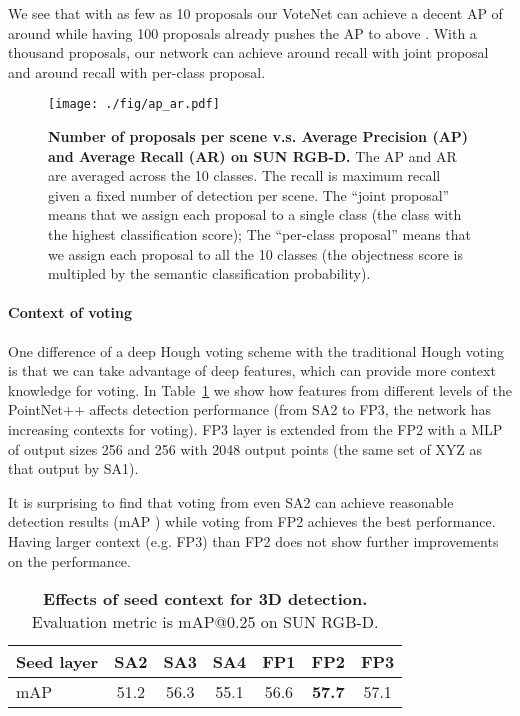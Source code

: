 \documentclass[10pt,twocolumn,letterpaper]{article}
\newcommand\votenet{VoteNet}
\begin{document}
We see that with as few as 10 proposals our \votenet{} can achieve a decent AP of around  while having 100 proposals already pushes the AP to above . With a thousand proposals, our network can achieve around  recall with joint proposal and around  recall with per-class proposal.

\begin{figure}
    \centering
    \texttt{[image: ./fig/ap\_ar.pdf]}
    \caption{\textbf{Number of proposals per scene v.s. Average Precision (AP) and Average Recall (AR) on SUN RGB-D.} The AP and AR are averaged across the 10 classes. The recall is maximum recall given a fixed number of detection per scene. The ``joint proposal'' means that we assign each proposal to a single class (the class with the highest classification score); The ``per-class proposal'' means that we assign each proposal to all the 10 classes (the objectness score is multipled by the semantic classification probability).}
    \label{fig:ap_ar}
\end{figure}

\paragraph{Context of voting}
One difference of a deep Hough voting scheme with the traditional Hough voting is that we can take advantage of deep features, which can provide more context knowledge for voting. In Table~\ref{tab:vote_context} we show how features from different levels of the PointNet++ affects detection performance (from SA2 to FP3, the network has increasing contexts for voting). FP3 layer is extended from the FP2 with a MLP of output sizes 256 and 256 with 2048 output points (the same set of XYZ as that output by SA1).

It is surprising to find that voting from even SA2 can achieve reasonable detection results (mAP ) while voting from FP2 achieves the best performance. Having larger context (e.g. FP3) than FP2 does not show further improvements on the performance.

\begin{table}[h]
    \begin{center}
    \begin{tabular}{l|cccccc}
    \toprule
         Seed layer & SA2 & SA3 & SA4 & FP1 & FP2 & FP3 \\ \midrule
         mAP & 51.2 & 56.3 & 55.1 & 56.6 & \textbf{57.7} & 57.1 \\ \bottomrule
    \end{tabular}
    \end{center}
    \caption{\textbf{Effects of seed context for 3D detection.} Evaluation metric is mAP@0.25 on SUN RGB-D.}
    \label{tab:vote_context}
\end{table}
\end{document}
